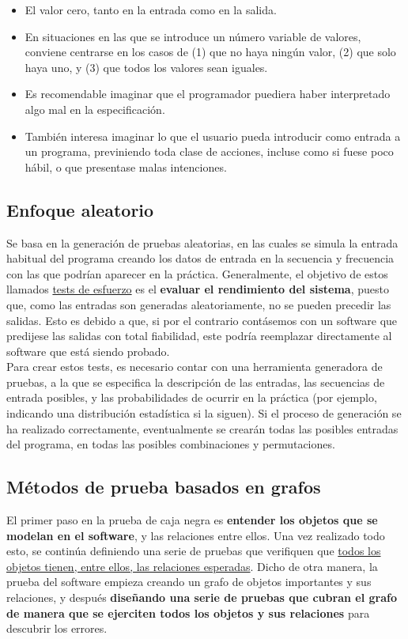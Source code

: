 \begin{itemize}
    \item El valor cero, tanto en la entrada como en la salida.
    \item En situaciones en las que se introduce un número variable de valores, conviene centrarse en los casos de (1) que no haya ningún valor, (2) que solo haya uno, y (3) que todos los valores sean iguales.
    \item Es recomendable imaginar que el programador puediera haber interpretado algo mal en la especificación.
    \item También interesa imaginar lo que el usuario pueda introducir como entrada a un programa, previniendo toda clase de acciones, incluse como si fuese poco hábil, o que presentase malas intenciones.
\end{itemize}

\subsection{Enfoque aleatorio}

Se basa en la generación de pruebas aleatorias, en las cuales se simula la entrada habitual del programa creando los datos de entrada en la secuencia y frecuencia con las que podrían aparecer en la práctica. Generalmente, el objetivo de estos llamados \uline{tests de esfuerzo} es el \textbf{evaluar el rendimiento del sistema}, puesto que, como las entradas son generadas aleatoriamente, no se pueden precedir las salidas. Esto es debido a que, si por el contrario contásemos con un software que predijese las salidas con total fiabilidad, este podría reemplazar directamente al software que está siendo probado.\\

Para crear estos tests, es necesario contar con una herramienta generadora de pruebas, a la que se especifica la descripción de las entradas, las secuencias de entrada posibles, y las probabilidades de ocurrir en la práctica (por ejemplo, indicando una distribución estadística si la siguen). Si el proceso de generación se ha realizado correctamente, eventualmente se crearán todas las posibles entradas del programa, en todas las posibles combinaciones y permutaciones. 

\subsection{Métodos de prueba basados en grafos}

El primer paso en la prueba de caja negra es \textbf{entender los objetos que se modelan en el software}, y las relaciones entre ellos. Una vez realizado todo esto, se continúa definiendo una serie de pruebas que verifiquen que \uline{todos los objetos tienen, entre ellos, las relaciones esperadas}. Dicho de otra manera, la prueba del software empieza creando un grafo de objetos importantes y sus relaciones, y después \textbf{diseñando una serie de pruebas que cubran el grafo de manera que se ejerciten todos los objetos y sus relaciones} para descubrir los errores.\\

